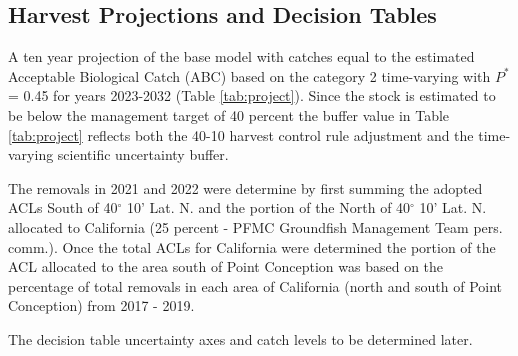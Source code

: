 \documentclass[11pt,
  english,
  a4paper,
]{article}
\begin{document}
\leavevmode\tagmcend\tagstructend\par


\hypertarget{harvest-projections-and-decision-tables}{%
\subsection{Harvest Projections and Decision Tables}\label{harvest-projections-and-decision-tables}}

\leavevmode\tagmcend\tagstructend


A ten year projection of the base model with catches equal to the estimated Acceptable Biological Catch (ABC) based on the category 2 time-varying with {\(P^*\)\leavevmode\tagmcend\tagstructend} = 0.45 for years 2023-2032 (Table \ref{tab:project}). Since the stock is estimated to be below the management target of 40 percent the buffer value in Table \ref{tab:project} reflects both the 40-10 harvest control rule adjustment and the time-varying scientific uncertainty buffer.

\leavevmode\tagmcend\tagstructend\par


The removals in 2021 and 2022 were determine by first summing the adopted ACLs South of 40{\(^\circ\)\leavevmode\tagmcend\tagstructend} 10' Lat. N. and the portion of the North of 40{\(^\circ\)\leavevmode\tagmcend\tagstructend} 10' Lat. N. allocated to California (25 percent - PFMC Groundfish Management Team pers. comm.). Once the total ACLs for California were determined the portion of the ACL allocated to the area south of Point Conception was based on the percentage of total removals in each area of California (north and south of Point Conception) from 2017 - 2019.

\leavevmode\tagmcend\tagstructend\par


The decision table uncertainty axes and catch levels to be determined later.

\leavevmode\tagmcend\tagstructend\par
\end{document}
